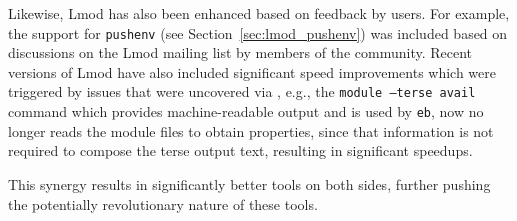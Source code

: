 Likewise, Lmod has also been enhanced based on feedback by \easybuild{} users.
For example, the support for \texttt{pushenv} (see
Section~\ref{sec:lmod_pushenv}) was included based on discussions on the Lmod
mailing list by members of the \easybuild{} community. Recent versions of Lmod
have also included significant speed improvements which were triggered by issues
that were uncovered via \easybuild{}, e.g., the \texttt{module --terse avail}
command which provides machine-readable output and is used by \texttt{\small eb}, now
no longer reads the module files to obtain properties, since that information is not
required to compose the terse output text, resulting in significant speedups.

This synergy results in significantly better tools on both sides, further
pushing the potentially revolutionary nature of these tools.
